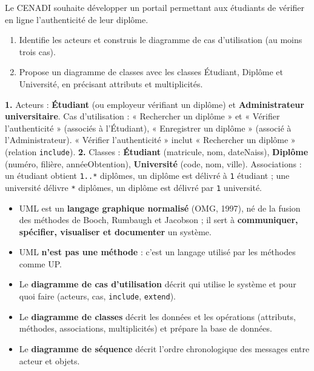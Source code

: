 \documentclass[11pt]{article}
\begin{document}
\begin{exercice}
Le CENADI souhaite développer un portail permettant aux étudiants de vérifier en ligne l'authenticité de leur diplôme.
\begin{enumerate}
\item Identifie les acteurs et construis le diagramme de cas d'utilisation (au moins trois cas).
\item Propose un diagramme de classes avec les classes Étudiant, Diplôme et Université, en précisant attributs et multiplicités.
\end{enumerate}
\end{exercice}

\begin{corrige}
\textbf{1.} Acteurs : \textbf{Étudiant} (ou employeur vérifiant un diplôme) et \textbf{Administrateur universitaire}. Cas d'utilisation : « Rechercher un diplôme » et « Vérifier l'authenticité » (associés à l'Étudiant), « Enregistrer un diplôme » (associé à l'Administrateur). « Vérifier l'authenticité » inclut « Rechercher un diplôme » (relation \texttt{include}).
\textbf{2.} Classes : \textbf{Étudiant} (matricule, nom, dateNaiss), \textbf{Diplôme} (numéro, filière, annéeObtention), \textbf{Université} (code, nom, ville). Associations : un étudiant obtient \texttt{1..*} diplômes, un diplôme est délivré à \texttt{1} étudiant ; une université délivre \texttt{*} diplômes, un diplôme est délivré par \texttt{1} université.
\end{corrige}

\begin{aretenir}
\begin{itemize}
\item UML est un \textbf{langage graphique normalisé} (OMG, 1997), né de la fusion des méthodes de Booch, Rumbaugh et Jacobson ; il sert à \textbf{communiquer, spécifier, visualiser et documenter} un système.
\item UML \textbf{n'est pas une méthode} : c'est un langage utilisé par les méthodes comme UP.
\item Le \textbf{diagramme de cas d'utilisation} décrit qui utilise le système et pour quoi faire (acteurs, cas, \texttt{include}, \texttt{extend}).
\item Le \textbf{diagramme de classes} décrit les données et les opérations (attributs, méthodes, associations, multiplicités) et prépare la base de données.
\item Le \textbf{diagramme de séquence} décrit l'ordre chronologique des messages entre acteur et objets.
\end{itemize}
\end{aretenir}
\end{document}

